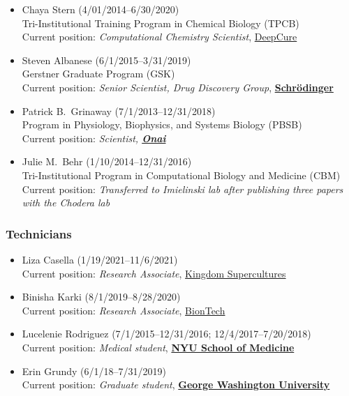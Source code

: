 \documentclass[10pt]{article}
\begin{document}
\begin{itemize}
  \item Chaya Stern (4/01/2014--6/30/2020)\\
  Tri-Institutional Training Program in Chemical Biology (TPCB)\\
  Current position: \emph{Computational Chemistry Scientist},  \href{http://deepcure.ai}{DeepCure}
 
  \item Steven Albanese (6/1/2015--3/31/2019)\\
  Gerstner Graduate Program (GSK)\\
  Current position: \emph{Senior Scientist, Drug Discovery Group},  \href{http://www.schrodinger.com}{{\bf Schr\"{o}dinger}}
  
  \item Patrick B.~Grinaway (7/1/2013--12/31/2018)\\
  Program in Physiology, Biophysics, and Systems Biology (PBSB)\\
  Current position: \emph{Scientist, \href{https://www.onai.com}{\bf Onai}}

  \item Julie M.~Behr (1/10/2014--12/31/2016)\\
  Tri-Institutional Program in Computational Biology and Medicine (CBM)\\
  Current position: \emph{Transferred to Imielinski lab after publishing three papers with the Chodera lab} 

\end{itemize}
  
\subsubsection*{Technicians}

\begin{itemize}

  \item Liza Casella (1/19/2021--11/6/2021)\\
  Current position: \emph{Research Associate}, \href{https://www.kingdomsupercultures.com/}{Kingdom Supercultures}
  
  \item Binisha Karki (8/1/2019--8/28/2020)\\
  Current position: \emph{Research Associate}, \href{http://biontech.de}{BionTech}

  \item Lucelenie Rodriguez (7/1/2015--12/31/2016; 12/4/2017--7/20/2018)\\
  Current position: \emph{Medical student}, \href{https://med.nyu.edu/education}{\bf NYU School of Medicine}

  \item Erin Grundy (6/1/18--7/31/2019)\\
  Current position: \emph{Graduate student}, \href{https://smhs.gwu.edu/ibs/program/microbio-immunology}{\bf George Washington University}
\end{itemize}
\end{document}
